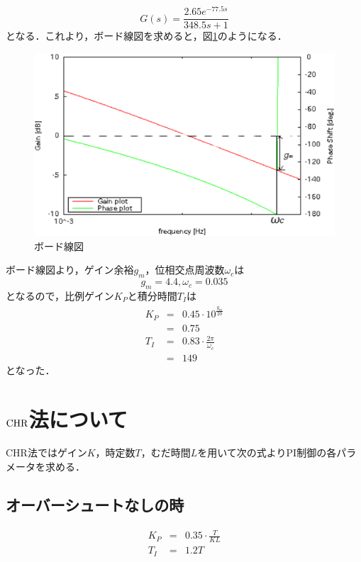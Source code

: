 \documentclass[11pt,a4paper]{jsarticle}
\begin{document}
\begin{equation}
  G(s) = \frac{2.65e^{-77.5s}}{348.5s+1} 
\end{equation}
となる．これより，ボード線図を求めると，図\ref{fig13}のようになる．

\begin{figure}[H]
 \begin{center}
  \includegraphics[scale=.5]{./picture/bode4.eps}
  \caption{ボード線図}
  \label{fig13}
 \end{center}
\end{figure}

ボード線図より，ゲイン余裕$g_m$，位相交点周波数$\omega_c$は
\begin{equation}
 g_m = 4.4, \omega_c = 0.035 \nonumber
\end{equation}
となるので，比例ゲイン$K_P$と積分時間$T_I$は
\begin{eqnarray}
K_P & = & 0.45 \cdot 10^{\frac{g_m}{20}} \\
    & = & 0.75 \\
T_I & = & 0.83 \cdot \frac{2\pi}{\omega_c} \\
    & = & 149 
\end{eqnarray}
となった．


 \newpage
\section{$\rm{CHR}$法について}
CHR法ではゲイン$K$，時定数$T$，むだ時間$L$を用いて次の式よりPI制御の各パラメータを求める．
\subsection{オーバーシュートなしの時}
\begin{eqnarray*}
 K_P & = & 0.35 \cdot \frac{T}{KL} \\
 T_I & = & 1.2T
\end{eqnarray*}
\end{document}

